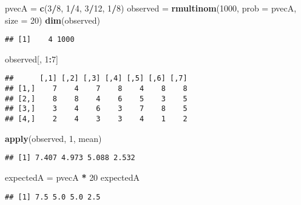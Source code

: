\documentclass[]{article}
\newenvironment{Shaded}{\begin{snugshade}}{\end{snugshade}}
\newcommand{\KeywordTok}[1]{\textcolor[rgb]{0.13,0.29,0.53}{\textbf{#1}}}
\newcommand{\DataTypeTok}[1]{\textcolor[rgb]{0.13,0.29,0.53}{#1}}
\newcommand{\DecValTok}[1]{\textcolor[rgb]{0.00,0.00,0.81}{#1}}
\newcommand{\StringTok}[1]{\textcolor[rgb]{0.31,0.60,0.02}{#1}}
\newcommand{\OperatorTok}[1]{\textcolor[rgb]{0.81,0.36,0.00}{\textbf{#1}}}
\newcommand{\NormalTok}[1]{#1}
\begin{document}
\begin{Shaded}
\begin{Highlighting}[]
\NormalTok{pvecA =}\StringTok{ }\KeywordTok{c}\NormalTok{(}\DecValTok{3}\OperatorTok{/}\DecValTok{8}\NormalTok{, }\DecValTok{1}\OperatorTok{/}\DecValTok{4}\NormalTok{, }\DecValTok{3}\OperatorTok{/}\DecValTok{12}\NormalTok{, }\DecValTok{1}\OperatorTok{/}\DecValTok{8}\NormalTok{)}
\NormalTok{observed =}\StringTok{ }\KeywordTok{rmultinom}\NormalTok{(}\DecValTok{1000}\NormalTok{, }\DataTypeTok{prob =}\NormalTok{ pvecA, }\DataTypeTok{size =} \DecValTok{20}\NormalTok{)}
\KeywordTok{dim}\NormalTok{(observed)}
\end{Highlighting}
\end{Shaded}

\begin{verbatim}
## [1]    4 1000
\end{verbatim}

\begin{Shaded}
\begin{Highlighting}[]
\NormalTok{observed[, }\DecValTok{1}\OperatorTok{:}\DecValTok{7}\NormalTok{]}
\end{Highlighting}
\end{Shaded}

\begin{verbatim}
##      [,1] [,2] [,3] [,4] [,5] [,6] [,7]
## [1,]    7    4    7    8    4    8    8
## [2,]    8    8    4    6    5    3    5
## [3,]    3    4    6    3    7    8    5
## [4,]    2    4    3    3    4    1    2
\end{verbatim}

\begin{Shaded}
\begin{Highlighting}[]
\KeywordTok{apply}\NormalTok{(observed, }\DecValTok{1}\NormalTok{, mean)}
\end{Highlighting}
\end{Shaded}

\begin{verbatim}
## [1] 7.407 4.973 5.088 2.532
\end{verbatim}

\begin{Shaded}
\begin{Highlighting}[]
\NormalTok{expectedA =}\StringTok{ }\NormalTok{pvecA }\OperatorTok{*}\StringTok{ }\DecValTok{20}
\NormalTok{expectedA}
\end{Highlighting}
\end{Shaded}

\begin{verbatim}
## [1] 7.5 5.0 5.0 2.5
\end{verbatim}
\end{document}
